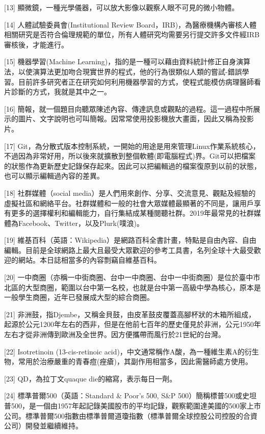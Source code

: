 \documentclass[a5paper, 10pt
]{book}
\begin{document}
{[}13{]} 顯微鏡，一種光學儀器，可以放大影像以觀察人眼不可見的微小物體。

{[}14{]} 人體試驗委員會(Institutional Review
Board，IRB)，為醫療機構內審核人體相關研究是否符合倫理規範的單位，所有人體研究均需要另行提交許多文件經IRB審核後，才能進行。

{[}15{]} 機器學習(Machine
Learning)，指的是一種可以藉由資料統計修正自身演算法，以使演算法更加吻合現實世界的程式，他的行為很類似人類的嘗試-錯誤學習。目前許多研究者正在研究如何利用機器學習的方式，使程式能模仿病理醫師看片診斷的方式，我就是其中之一。

{[}16{]}
簡報，就一個題目向聽眾陳述內容、傳達訊息或觀點的過程。這一過程中所展示的圖片、文字說明也可叫簡報。因常常使用投影機放大畫面，因此又稱為投影片。

{[}17{]}
Git，為分散式版本控制系統，一開始的用途是用來管理Linux作業系統核心，不過因為非常好用，所以後來就擴散到整個軟體(即電腦程式)界。Git可以把檔案的狀態作為更新歷史記錄保存起來。因此可以把編輯過的檔案復原到以前的狀態，也可以顯示編輯過內容的差異。

{[}18{]} 社群媒體（social
media）是人們用來創作、分享、交流意見、觀點及經驗的虛擬社區和網絡平台。社群媒體和一般的社會大眾媒體最顯著的不同是，讓用戶享有更多的選擇權利和編輯能力，自行集結成某種閱聽社群。2019年最常見的社群媒體為Facebook、Twitter，以及Plurk(噗浪)。

{[}19{]}
維基百科（英語：Wikipedia）是網路百科全書計畫，特點是自由內容、自由編輯。目前是全球網路上最大且最受大眾歡迎的參考工具書，名列全球十大最受歡迎的網站。本日誌相當多的內容剽竊自維基百科。

{[}20{]}
一中商圈（亦稱一中街商圈、台中一中商圈、台中一中街商圈）是位於臺中市北區的大型商圈，範圍以台中第一名校，也就是台中第一高級中學為核心，原本是一般學生商圈，近年已發展成大型的綜合商圈。

{[}21{]}
非洲鼓，指Djembe，又稱金貝鼓，由皮革鼓皮覆蓋高腳杯狀的木箱所組成，起源於公元1200年左右的西非，但是在他前七百年的歷史僅見於非洲，公元1950年左右才從非洲傳到歐洲及全世界。因方便攜帶而風行於21世紀的台灣。

{[}22{]} Isotretinoin (13-cis-retinoic
acid)，中文通常稱作A酸，為一種維生素A的衍生物，常用於治療嚴重的青春痘(痤瘡)，其副作用相當多，因此需醫師處方使用。

{[}23{]} QD，為拉丁文quaque die的縮寫，表示每日一劑。

{[}24{]} 標準普爾500（英語：Standard \& Poor's 500, S\&P
500）簡稱標普500或史坦普500，是一個由1957年起記錄美國股市的平均記錄，觀察範圍達美國的500家上市公司。標準普爾500指數由標準普爾道瓊指數（標準普爾全球控股公司控股的合資公司）開發並繼續維持。
\end{document}
